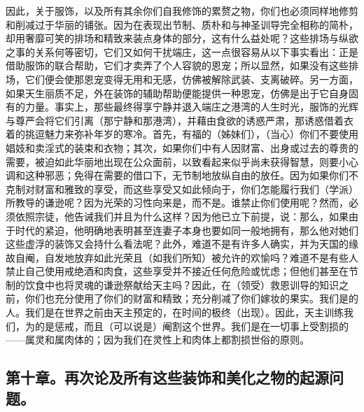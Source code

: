 因此，关于服饰，以及所有其余你们自我修饰的累赘之物，你们也必须同样地修剪和削减过于华丽的铺张。因为在表现出节制、质朴和与神圣训导完全相称的简朴，却用奢靡可笑的排场和精致来装点身体的部分，这有什么益处呢？这些排场与纵欲之事的关系何等密切，它们又如何干扰端庄，这一点很容易从以下事实看出：正是借助服饰的联合帮助，它们才卖弄了个人容貌的恩宠；所以显然，如果没有这些排场，它们便会使那恩宠变得无用和无感，仿佛被解除武装、支离破碎。另一方面，如果天生丽质不足，外在装饰的辅助帮助便能提供一种恩宠，仿佛是出于它自身固有的力量。事实上，那些最终得享宁静并退入端庄之港湾的人生时光，服饰的光辉与尊严会将它们引离（那宁静和那港湾），并藉由食欲的诱惑严肃，那诱惑借着衣着的挑逗魅力来弥补年岁的寒冷。首先，有福的（姊妹们），（当心）你们不要使用娼妓和卖淫式的装束和衣物；其次，如果你们中有人因财富、出身或过去的尊贵的需要，被迫如此华丽地出现在公众面前，以致看起来似乎尚未获得智慧，则要小心调和这种邪恶；免得在需要的借口下，无节制地放纵自由的放任。因为如果你们不克制对财富和雅致的享受，而这些享受又如此倾向于，你们怎能履行我们（学派）所教导的谦逊呢？因为光荣的习性向来是，而不是。谁禁止你们使用呢？然而，必须依照宗徒，他告诫我们并且为什么这样？因为他已立下前提，说：那么，如果由于时代的紧迫，他明确地表明甚至连妻子本身也要如同一般地拥有，那么他对她们这些虚浮的装饰又会持什么看法呢？此外，难道不是有许多人确实，并为天国的缘故自阉，自发地放弃如此光荣且（如我们所知）被允许的欢愉吗？难道不是有些人禁止自己使用戒绝酒和肉食，这些享受并不接近任何危险或忧虑；但他们甚至在节制的饮食中也将灵魂的谦逊祭献给天主吗？因此，在（领受）救恩训导的知识之前，你们也充分使用了你们的财富和精致；充分削减了你们嫁妆的果实。我们是的人。我们是在世界之前由天主预定的，在时间的极终（出现）。因此，天主训练我们，为的是惩戒，而且（可以说是）阉割这个世界。我们是在一切事上受割损的——属灵和属肉体的；因为我们在灵性上和肉体上都割损世俗的原则。\par


\subsection{第十章。再次论及所有这些装饰和美化之物的起源问题。}


